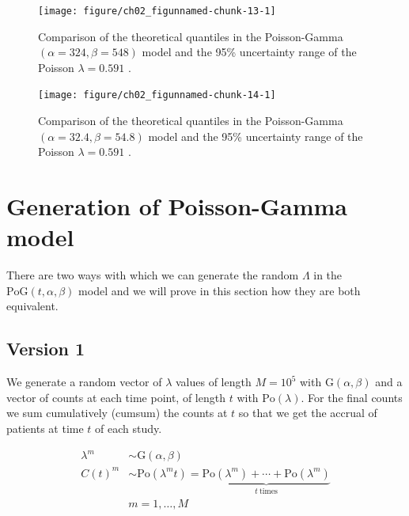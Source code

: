 \begin{figure}
\begin{knitrout}
\color{fgcolor}

{\centering \texttt{[image: figure/ch02\_figunnamed-chunk-13-1]} 

}


\end{knitrout}
  \caption{Comparison of the theoretical quantiles in the Poisson-Gamma $(\alpha = 324, \beta = 548)$ model and the 95\% uncertainty range of the Poisson $\lambda = 0.591$ \citep{spiegelhalter2011visualizing, pkgacc}.}
  \label{fig:2_11}
\end{figure}


\begin{figure}
\begin{knitrout}
\color{fgcolor}

{\centering \texttt{[image: figure/ch02\_figunnamed-chunk-14-1]} 

}


\end{knitrout}
  \caption{Comparison of the theoretical quantiles in the Poisson-Gamma $(\alpha = 32.4, \beta = 54.8)$ model and the 95\% uncertainty range of the Poisson $\lambda = 0.591$ \citep{spiegelhalter2011visualizing, pkgacc}.}
  \label{fig:2_11a}
\end{figure}

\section{Generation of Poisson-Gamma model}

There are two ways with which we can generate the random $\Lambda$ in the $\textrm{PoG}(t, \alpha, \beta)$ model and we will prove in this section how they are both equivalent.

\subsection{Version 1}

We generate a random vector of $\lambda$ values of length $M=10^5$ with $\textrm{G}(\alpha, \beta)$ and a vector of counts at each time point, of length $t$ with $\textrm{Po}(\lambda)$. For the final counts we sum cumulatively (cumsum) the counts at $t$ so that we get the accrual of patients at time $t$ of each study.

\begin{align*}
\lambda^m &\sim \textrm{G}(\alpha, \beta) \\
C(t)^m &\sim \textrm{Po} (\lambda^m t) = \underbrace{\textrm{Po} (\lambda^m) +\cdots +\textrm{Po} (\lambda^m)}_{t \ \text{times}}\\
& m = 1, \ldots, M
\end{align*}

